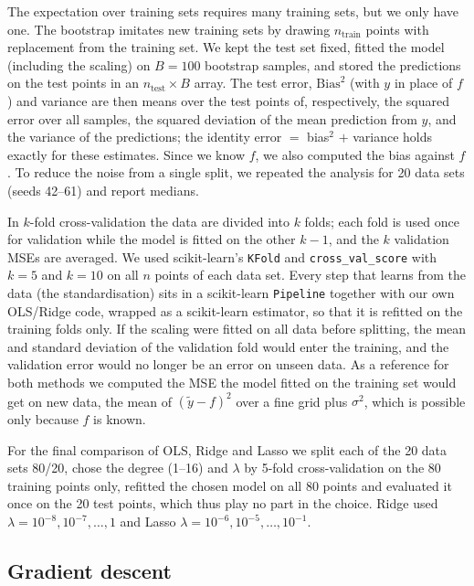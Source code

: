 The expectation over training sets requires many training sets, but we only have one. The bootstrap \cite[Sec.~2.11]{HjorthJensen2026} imitates new training sets by drawing $n_{\mathrm{train}}$ points with replacement from the training set. We kept the test set fixed, fitted the model (including the scaling) on $B = 100$ bootstrap samples, and stored the predictions on the test points in an $n_{\mathrm{test}} \times B$ array. The test error, $\mathrm{Bias}^2$ (with $y$ in place of $f$) and variance are then means over the test points of, respectively, the squared error over all samples, the squared deviation of the mean prediction from $y$, and the variance of the predictions; the identity error $=$ bias$^2$ $+$ variance holds exactly for these estimates. Since we know $f$, we also computed the bias against $f$. To reduce the noise from a single split, we repeated the analysis for 20 data sets (seeds 42--61) and report medians.

In $k$-fold cross-validation \cite[Sec.~2.12]{HjorthJensen2026} the data are divided into $k$ folds; each fold is used once for validation while the model is fitted on the other $k-1$, and the $k$ validation MSEs are averaged. We used scikit-learn's \texttt{KFold} and \texttt{cross\_val\_score} with $k = 5$ and $k = 10$ on all $n$ points of each data set. Every step that learns from the data (the standardisation) sits in a scikit-learn \texttt{Pipeline} together with our own OLS/Ridge code, wrapped as a scikit-learn estimator, so that it is refitted on the training folds only. If the scaling were fitted on all data before splitting, the mean and standard deviation of the validation fold would enter the training, and the validation error would no longer be an error on unseen data. As a reference for both methods we computed the MSE the model fitted on the training set would get on new data, the mean of $(\tilde{y} - f)^2$ over a fine grid plus $\sigma^2$, which is possible only because $f$ is known.

For the final comparison of OLS, Ridge and Lasso we split each of the 20 data sets 80/20, chose the degree (1--16) and $\lambda$ by 5-fold cross-validation on the 80 training points only, refitted the chosen model on all 80 points and evaluated it once on the 20 test points, which thus play no part in the choice. Ridge used $\lambda = 10^{-8}, 10^{-7}, \dots, 1$ and Lasso $\lambda = 10^{-6}, 10^{-5}, \dots, 10^{-1}$.

\subsection{Gradient descent}\label{sec:gd}

